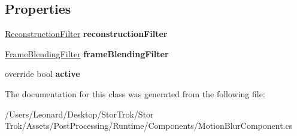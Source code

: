 \subsection*{Properties}
\begin{DoxyCompactItemize}
\item 
\mbox{\label{class_unity_engine_1_1_post_processing_1_1_motion_blur_component_aea13feeae21a2323a05a78650f761594}} 
\hyperlink{class_unity_engine_1_1_post_processing_1_1_motion_blur_component_1_1_reconstruction_filter}{Reconstruction\+Filter} {\bfseries reconstruction\+Filter}
\item 
\mbox{\label{class_unity_engine_1_1_post_processing_1_1_motion_blur_component_a21f0734301f3bd60e1454df1540c3a79}} 
\hyperlink{class_unity_engine_1_1_post_processing_1_1_motion_blur_component_1_1_frame_blending_filter}{Frame\+Blending\+Filter} {\bfseries frame\+Blending\+Filter}
\item 
\mbox{\label{class_unity_engine_1_1_post_processing_1_1_motion_blur_component_aef85ae6ce557465b097ed27e23f0a27e}} 
override bool {\bfseries active}
\end{DoxyCompactItemize}


The documentation for this class was generated from the following file\+:\begin{DoxyCompactItemize}
\item 
/\+Users/\+Leonard/\+Desktop/\+Stor\+Trok/\+Stor Trok/\+Assets/\+Post\+Processing/\+Runtime/\+Components/Motion\+Blur\+Component.\+cs\end{DoxyCompactItemize}
